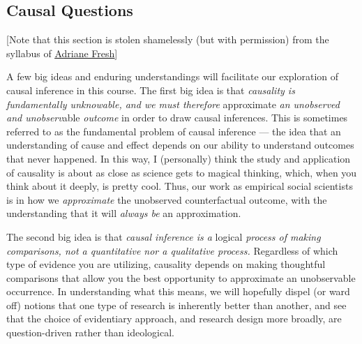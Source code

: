 \documentclass[12pt]{article}
\begin{document}
\subsection{Causal Questions}

[Note that this section is stolen shamelessly (but with permission) from the syllabus of \href{http://www.adrianefresh.com}{\underline{Adriane Fresh}}]

A few big ideas and enduring understandings will facilitate our exploration of causal inference in this course.  The first big idea is that \emph{causality is fundamentally unknowable, and we must therefore} approximate \emph{an unobserved and unobserv}able \emph{outcome} in order to draw causal inferences.  This is sometimes referred to as the fundamental problem of causal inference --- the idea that an understanding of cause and effect depends on our ability to understand outcomes that never happened.  In this way, I (personally) think the study and application of causality is about as close as science gets to magical thinking, which, when you think about it deeply, is pretty cool.  Thus, our work as empirical social scientists is in how we \emph{approximate} the unobserved counterfactual outcome, with the understanding that it will \emph{always be} an approximation.

The second big idea is that \emph{causal inference is a} logical \emph{process of making comparisons, not a quantitative nor a qualitative process.}  Regardless of which type of evidence you are utilizing, causality depends on making thoughtful comparisons that allow you the best opportunity to approximate an unobservable occurrence.  In understanding what this means, we will hopefully dispel (or ward off) notions that one type of research is inherently better than another, and see that the choice of evidentiary approach, and research design more broadly, are question-driven rather than ideological.
\end{document}
